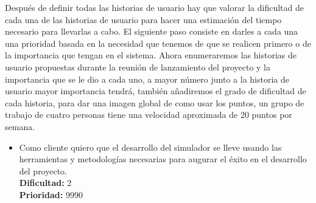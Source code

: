 \documentclass[12pt,a4paper,spanish]{book} %
\begin{document}
Después de definir todas las historias de usuario hay que valorar la dificultad de cada una de las historias de usuario para hacer una estimación del tiempo necesario para llevarlas a cabo.  El siguiente paso consiste en darles a cada una una prioridad basada en la necesidad que tenemos de que se realicen primero o de la importancia que tengan en el sistema. Ahora enumeraremos las historias de usuario propuestas durante la reunión de lanzamiento del proyecto y la importancia que se le dio a cada uno, a mayor número junto a la historia de usuario mayor importancia tendrá, también añadiremos el grado de dificultad de cada historia, para dar una imagen global de como usar los puntos, un grupo de trabajo de cuatro personas tiene una velocidad aproximada de 20 puntos por semana.

\begin{itemize}

\item Como cliente quiero que el desarrollo del simulador se lleve usando las herramientas y metodologías necesarias para augurar el éxito en el desarrollo del proyecto.
\\
\textbf{Dificultad: }2
\\
\textbf{Prioridad: }9990


\end{itemize}
\end{document}

